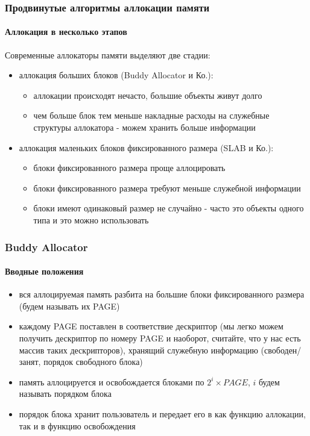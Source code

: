 \begin{frame}
\frametitle{Продвинутые алгоритмы аллокации памяти}
\framesubtitle{Аллокация в несколько этапов}

Современные аллокаторы памяти выделяют две стадии:

\begin{itemize}
  \item<2-> аллокация больших блоков (Buddy Allocator и Ко.):
    \begin{itemize}
      \item аллокации происходят нечасто, большие объекты живут долго
      \item чем больше блок тем меньше накладные расходы на служебные структуры аллокатора - можем хранить больше информации
    \end{itemize}
  \item<3-> аллокация маленьких блоков фиксированного размера (SLAB и Ко.):
    \begin{itemize}
      \item блоки фиксированного размера проще аллоцировать
      \item блоки фиксированного размера требуют меньше служебной информации
      \item блоки имеют одинаковый размер не случайно - часто это объекты одного типа и это можно использовать
    \end{itemize}
\end{itemize}

\end{frame}

\begin{frame}
\frametitle{Buddy Allocator}
\framesubtitle{Вводные положения}

\begin{itemize}
  \item вся аллоцируемая память разбита на большие блоки фиксированного размера (будем называть их PAGE)
  \item каждому PAGE поставлен в соответствие дескриптор (мы легко можем получить дескриптор по номеру PAGE и наоборот, считайте, что у нас есть массив таких дескрипторов), хранящий служебную информацию (свободен/занят, порядок свободного блока)
  \item память аллоцируется и освобождается блоками по $2^i\times PAGE$, $i$ будем называть порядком блока
  \item порядок блока хранит пользователь и передает его в как функцию аллокации, так и в функцию освобождения
\end{itemize}
\end{frame}

